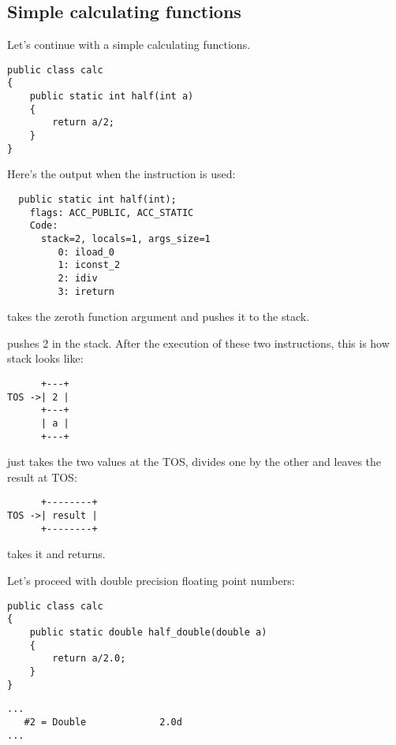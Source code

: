 \subsection{Simple calculating functions}

Let's continue with a simple calculating functions.

\begin{lstlisting}[style=customjava]
public class calc
{
	public static int half(int a)
	{
		return a/2;
	}
}
\end{lstlisting}

Here's the output when the  instruction is used:


\begin{lstlisting}
  public static int half(int);
    flags: ACC_PUBLIC, ACC_STATIC
    Code:
      stack=2, locals=1, args_size=1
         0: iload_0       
         1: iconst_2      
         2: idiv          
         3: ireturn       
\end{lstlisting}
         
 takes the zeroth function argument and pushes it to the stack.

 pushes 2 in the stack.
After the execution of these two instructions, this is how stack looks like:


\begin{lstlisting}
      +---+
TOS ->| 2 |
      +---+
      | a |
      +---+
\end{lstlisting}

 just takes the two values at the \ac{TOS}, divides one by the other and leaves
the result at \ac{TOS}:


\begin{lstlisting}
      +--------+
TOS ->| result |
      +--------+
\end{lstlisting}

 takes it and returns.

Let's proceed with double precision floating point numbers:


\begin{lstlisting}[style=customjava]
public class calc
{
	public static double half_double(double a)
	{
		return a/2.0;
	}
}
\end{lstlisting}

\begin{lstlisting}[caption=Constant pool]
...
   #2 = Double             2.0d
...
\end{lstlisting}

